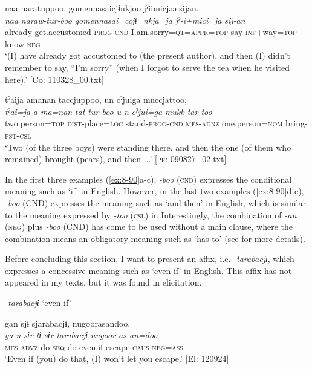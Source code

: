 \ex
{\TM}
\glll  naa  naratuppoo,  {\textbar}gomennasai{\textbar}cjɨnkjoo     jˀiimicjəə  sijan.\\
\textit{naa}  \textit{naraw-tur-boo}  \textit{gomennasai=ccjɨ=nkja=ja}  \textit{jˀ-i+mici=ja}  \textit{sij-an}\\
already  get.accustomed-\textsc{prog}-\textsc{cnd}  I.am.sorry=\textsc{qt}=\textsc{appr}=\textsc{top} say-\textsc{inf}+way=\textsc{top}  know-\textsc{neg}\\
\glt ‘(I) have already got accustomed to (the present author), and then (I) didn’t remember to say, “I’m sorry” (when I forgot to serve the tea when he visited here).’ [Co: 110328\_00.txt]

\ex
{\TM}
\glll  tˀaija  amanan  taccjuppoo,    un  cˀjuiga  muccjattoo,\\
\textit{tˀai=ja}  \textit{a-ma=nan}  \textit{tat-tur-boo}  \textit{u-n}  \textit{cˀjui=ga}  \textit{mukk-tar-too}\\
two.person=\textsc{top}  \textsc{dist}-place=\textsc{loc}  stand-\textsc{prog}-\textsc{cnd}  \textsc{mes}-\textsc{adnz}  one.person=\textsc{nom}  bring-\textsc{pst}-\textsc{csl}\\
\glt ‘Two (of the three boys) were standing there, and then the one (of them who remained) brought (pears), and then ...’ [\textsc{pf}: 090827\_02.txt]
\z
\z

In the first three examples (\ref{ex:8-90}a-c), \textit{-boo} (\textsc{cnd}) expresses the conditional meaning such as ‘if’ in English. However, in the last two examples (\ref{ex:8-90}d-e), \textit{-boo} (CND) expresses the meaning such as ‘and then’ in English, which is similar to the meaning expressed by \textit{-too} (\textsc{csl}) in  Interestingly, the combination of \textit{-an} (\textsc{neg}) plus \textit{-boo} (CND) has come to be used without a main clause, where the combination means an obligatory meaning such as ‘has to’ (see  for more details).

  Before concluding this section, I want to present an affix, i.e. \textit{-tarabacjɨ}, which expresses a concessive meaning such as ‘even if’ in English. This affix has not appeared in my texts, but it was found in elicitation.

\ea\label{ex:8-91}
  \textit{-tarabacjɨ} ‘even if’

\ea
{\TM}
\glll  gan  sjɨ  sjarabacjɨ,  nugoorasandoo.\\
\textit{ga-n}  \textit{sɨr-tɨ}  \textit{sɨr-tarabacjɨ}  \textit{nugoor-as-an=doo}\\
\textsc{mes}-\textsc{advz}  do-\textsc{seq}  do-even.if  escape-\textsc{caus}-\textsc{neg}=\textsc{ass}\\
\glt ‘Even if (you) do that, (I) won’t let you escape.’ [El: 120924]

